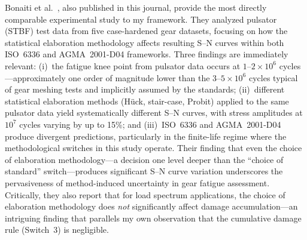 \documentclass[12pt,a4paper]{article}
\begin{document}
Bonaiti et al.~\cite{bonaiti2024}, also published in this journal,
provide the most directly comparable experimental study to my framework.
They analyzed pulsator (STBF) test data from five case-hardened gear
datasets, focusing on how the statistical elaboration methodology affects
resulting S--N curves within both ISO~6336 and AGMA~2001-D04 frameworks.
Three findings are immediately relevant: (i)~the fatigue knee point from
pulsator data occurs at $1$--$2\times10^6$ cycles---approximately one
order of magnitude lower than the $3$--$5\times10^6$ cycles typical of
gear meshing tests and implicitly assumed by the standards; (ii)~different
statistical elaboration methods (H\"uck, stair-case, Probit) applied to
the same pulsator data yield systematically different S--N curves, with
stress amplitudes at $10^7$ cycles varying by up to 15\%; and
(iii)~ISO~6336 and AGMA~2001-D04 produce divergent predictions,
particularly in the finite-life regime where the methodological switches
in this study operate. Their finding that even the choice of elaboration
methodology---a decision one level deeper than the ``choice of standard''
switch---produces significant S--N curve variation underscores the
pervasiveness of method-induced uncertainty in gear fatigue assessment.
Critically, they also report that for load spectrum applications, the
choice of elaboration methodology does \emph{not} significantly affect
damage accumulation---an intriguing finding that parallels my own
observation that the cumulative damage rule (Switch~3) is negligible.
\end{document}
